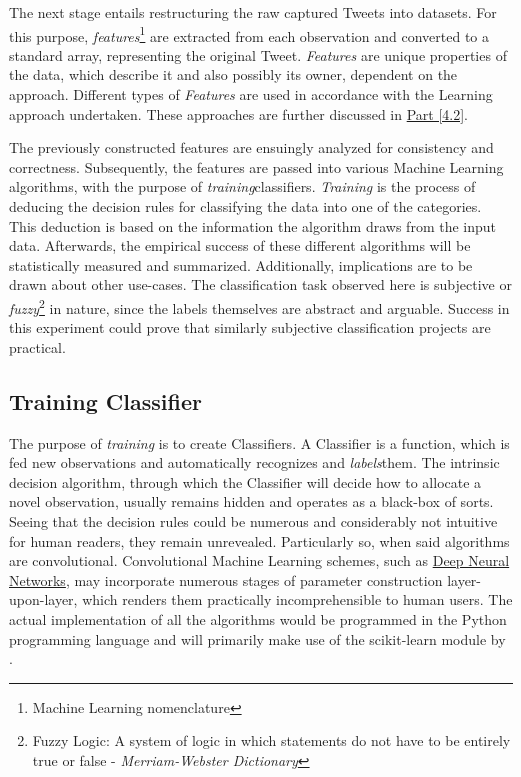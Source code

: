	\newpage
	
	The next stage entails restructuring the raw captured Tweets into datasets. For this purpose, \textit{features}\footnote{\label{ml_note}Machine Learning nomenclature} are extracted from each observation and converted to a standard array, representing the original Tweet. \textit{Features} are unique properties of the data, which describe it and also possibly its owner, dependent on the approach. Different types of \textit{Features} are used in accordance with the Learning approach undertaken. These approaches are further discussed in \hyperref[build_features]{Part [4.2]}.
	
	\par
	
	The previously constructed features are ensuingly analyzed for consistency and correctness. Subsequently, the features are passed into various Machine Learning algorithms, with the purpose of \textit{training}\footnotemark[1] classifiers. \textit{Training} is the process of deducing the decision rules for classifying the data into one of the categories. This deduction is based on the information the algorithm draws from the input data. Afterwards, the empirical success of these different algorithms will be statistically measured and summarized. Additionally, implications are to be drawn about other use-cases. The classification task observed here is subjective or \textit{fuzzy}\footnote{Fuzzy Logic: A system of logic in which statements do not have to be entirely true or false - \textit{Merriam-Webster Dictionary}} in nature, since the labels themselves are abstract and arguable. Success in this experiment could prove that similarly subjective classification projects are practical. 
	
	\subsection{Training Classifier}
	The purpose of \textit{training} is to create Classifiers. A Classifier is a function, which is fed new observations and automatically recognizes and \textit{labels}\footnotemark[1] them. The intrinsic decision algorithm, through which the Classifier will decide how to allocate a novel observation, usually remains hidden and operates as a black-box of sorts. Seeing that the decision rules could be numerous and considerably not intuitive for human readers, they remain unrevealed. Particularly so, when said algorithms are convolutional. Convolutional Machine Learning schemes, such as \hyperref[ann]{Deep Neural Networks}, may incorporate numerous stages of parameter construction layer-upon-layer, which renders them practically incomprehensible to human users. The actual implementation of all the algorithms would be programmed in the Python programming language and will primarily make use of the scikit-learn module by \cite{scikit-learn}.
	
